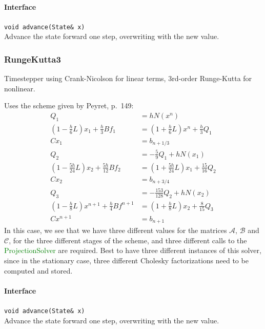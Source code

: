 \documentclass[11pt]{article}
\def\class#1{\textcolor{green}{\ttfamily\small #1}} %
\let\code\lstinline
\begin{document}
\paragraph{Interface}
\begin{description}
	\item \code|void advance(State& x)|\\
		Advance the state forward one step, overwriting with the new value.
\end{description}
		
\subsubsection{RungeKutta3}
Timestepper using Crank-Nicolson for linear terms, 3rd-order Runge-Kutta for nonlinear.

Uses the scheme given by Peyret, p.~149\cite{Peyret:2002}:
\begin{align}
	Q_1 &= hN(x^n)\\
	(1-\frac{h}{6}L)x_1 + \frac{h}{3}Bf_1 &= (1+\frac{h}{6}L)x^n + \frac{h}{3}Q_1\\
	Cx_1 &= b_{n+1/3}\\
	Q_2 &= -\frac{5}{9} Q_1 + hN(x_1)\\
	(1-\frac{5h}{24}L)x_2 + \frac{5h}{12}Bf_2 &= (1+\frac{5h}{24}L)x_1 + \frac{15}{16}Q_2\\
	Cx_2 &= b_{n+3/4}\\
	Q_3 &= -\frac{153}{128} Q_2 + hN(x_2)\\
	(1-\frac{h}{8}L)x^{n+1} + \frac{h}{4}Bf^{n+1} &= (1+\frac{h}{8}L)x_2 + \frac{8}{15}Q_3\\
	Cx^{n+1} &= b_{n+1}
\end{align}
In this case, we see that we have three different values for the matrices $\mathcal{A}$, $\mathcal{B}$ and $\mathcal{C}$, for the three different stages of the scheme, and three different calls to the \class{ProjectionSolver} are required.  Best to have three different instances of this solver, since in the stationary case, three different Cholesky factorizations need to be computed and stored.

\paragraph{Interface}
\begin{description}
	\item \code|void advance(State& x)|\\
		Advance the state forward one step, overwriting with the new value.
\end{description}
		
\end{document}

